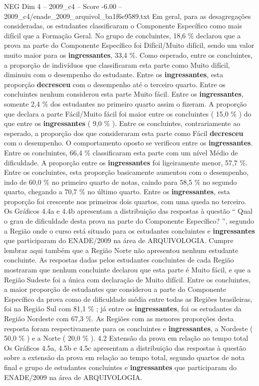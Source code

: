 \begin{textsample}{NEG Dim 4 – 2009\_c4 – Score -6.00 – 2009\_c4/enade\_2009\_arquivol\_ba1f6e9589.txt}
Em geral, para as desagregações consideradas, os estudantes classificaram o Componente Específico como mais difícil que a Formação Geral.
No grupo de concluintes, 18,6 \% declarou que a prova na parte do Componente Específico foi Difícil/Muito difícil, sendo um valor muito maior para os \textbf{ingressantes}, 33,4 \%.
Como esperado, entre os concluintes, a proporção de indivíduos que classificaram esta parte como Muito difícil, diminuiu com o desempenho do estudante.
Entre os \textbf{ingressantes}, esta proporção \textbf{decresceu} com o desempenho até o terceiro quarto.
Entre os concluintes nenhum considerou esta parte Muito fácil.
Entre os \textbf{ingressantes}, somente 2,4 \% dos estudantes no primeiro quarto assim o fizeram.
A proporção que declara a parte Fácil/Muito fácil foi maior entre os concluintes ( 15,0 \% ) do que entre os \textbf{ingressantes} ( 9,0 \% ).
Entre os concluintes, contrariamente ao esperado, a proporção dos que consideraram esta parte como Fácil \textbf{decresceu} com o desempenho.
O comportamento oposto se verificou entre os \textbf{ingressantes}.
Entre os concluintes, 66,4 \% classificaram esta parte com um nível Médio de dificuldade.
A proporção entre os \textbf{ingressantes} foi ligeiramente menor, 57,7 \%.
Entre os concluintes, esta proporção basicamente aumentou com o desempenho, indo de 60,0 \% no primeiro quarto de notas, caindo para 58,5 \% no segundo quarto, chegando a 70,7 \% no último quarto.
Entre os \textbf{ingressantes}, esta proporção foi crescente nos primeiros dois quartos, com uma queda no terceiro.
Os Gráficos 4.4a e 4.4b apresentam a distribuição das respostas à questão “ Qual o grau de dificuldade desta prova na parte do Componente Específico? ”, segundo a Região onde o curso está situado para os estudantes concluintes e \textbf{ingressantes} que participaram do ENADE/2009 na área de ARQUIVOLOGIA.
Cumpre lembrar aqui também que a Região Norte não apresentou nenhum estudante concluinte.
As respostas dadas pelos estudantes concluintes de cada Região mostraram que nenhum concluinte declarou que esta parte é Muito fácil, e que a Região Sudeste foi a única com declaração de Muito difícil.
Entre os concluintes, a maior proporção de estudantes que considerou a parte do Componente Específico da prova como de dificuldade média entre todas as Regiões brasileiras, foi na Região Sul com 81,1 \% ; já entre os \textbf{ingressantes}, foi os estudantes da Região Nordeste com 67,3 \%.
As Regiões com as menores proporções desta resposta foram respectivamente para os concluintes e \textbf{ingressantes}, a Nordeste ( 50,0 \% ) e a Norte ( 20,0 \% ). 4.2 Extensão da prova em relação ao tempo total Os Gráficos 4.5a, 4.5b e 4.5c apresentam a distribuição das respostas à questão sobre a extensão da prova em relação ao tempo total, segundo quartos de nota final e grupo de estudantes concluintes e \textbf{ingressantes} que participaram do ENADE/2009 na área de ARQUIVOLOGIA.

\end{textsample}
